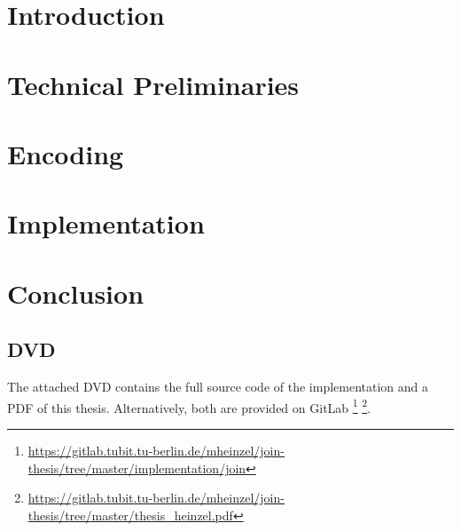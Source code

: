 \documentclass[a4paper,12pt,titlepage,twoside,BCOR=6mm,abstracton]{scrreprt}
\begin{document}



\cleardoublepage

\thispagestyle{empty}

\cleardoublepage



\cleardoublepage


\cleardoublepage
\tableofcontents
\pagebreak



\chapter{Introduction}


\chapter{Technical Preliminaries}



\chapter{Encoding}


\chapter{Implementation}






\chapter{Conclusion}





\begin{appendices}
  \chapter{DVD}
  The attached DVD contains the full source code of the implementation
  and a PDF of this thesis.
  Alternatively, both are provided on GitLab
  \footnote{\url{https://gitlab.tubit.tu-berlin.de/mheinzel/join-thesis/tree/master/implementation/join}}
  \footnote{\url{https://gitlab.tubit.tu-berlin.de/mheinzel/join-thesis/tree/master/thesis_heinzel.pdf}}.
\end{appendices}
\end{document}
